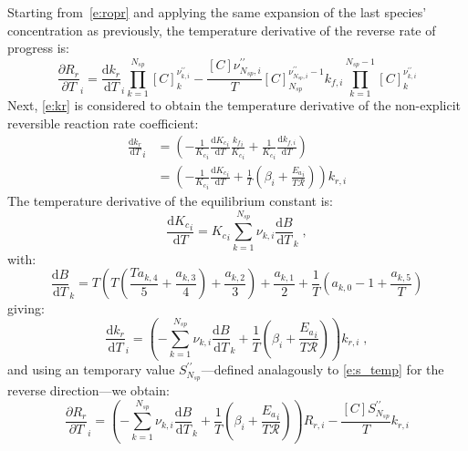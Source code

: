 \documentclass[12pt]{article}
\newcommand{\ns}{N_{sp}}
\newcommand{\Ru}{\mathcal{R}}
\begin{document}
Starting from~\cref{e:ropr} and applying the same expansion of the last species' concentration as previously, the temperature derivative of the reverse rate of progress is:
\begin{equation}
 \label{e:droprdt_1}
 \frac{\partial {R_r} }{\partial T }_{i} = \frac{\text{d} {k_r} }{\text{d} T }_{i} \prod_{k=1}^{\ns} [C]_{k}^{\nu^{\prime\prime}_{k,i}} - \frac{[C] \nu^{\prime\prime}_{\ns,i}}{T} [C]_{\ns}^{\nu^{\prime\prime}_{\ns,i} - 1} {k_{f, i}} \prod_{k=1}^{\ns  - 1} [C]_{k}^{\nu^{\prime\prime}_{k,i}}
\end{equation}
Next, \cref{e:kr} is considered to obtain the temperature derivative of the non-explicit reversible reaction rate coefficient:
\begin{align}
 \frac{\text{d} {k_r} }{\text{d} T }_{i} &= \left(- \frac{1}{{K_c}_{i}} \frac{\text{d} {K_c}_{i} }{\text{d} T } \frac{{k_f}_i}{{K_c}_i} + \frac{1}{{K_c}_{i}}\frac{\text{d} {k_{f, i}} }{\text{d} T } \right) \nonumber \\
				         &= \left(- \frac{1}{{K_c}_{i}} \frac{\text{d} {K_c}_{i} }{\text{d} T } + \frac{1}{T} \left(\beta_{i} + \frac{{E_{a}}_{i}}{T \Ru}\right)\right) {k_{r, i}}
\end{align}
The temperature derivative of the equilibrium constant is:
\begin{equation}
 \frac{\text{d} {K_c}_{i} }{\text{d} T } = {K_c}_{i} \sum_{k=1}^{\ns} \nu_{k,i} \frac{\text{d} B }{\text{d} T }_{k} \;,
\end{equation}
with:
\begin{equation}
 \frac{\text{d} B }{\text{d} T }_{k} = T \left(T \left(\frac{T a_{k,4}}{5} + \frac{a_{k,3}}{4}\right) + \frac{a_{k,2}}{3}\right) + \frac{a_{k,1}}{2} + \frac{1}{T} \left(a_{k,0} - 1 + \frac{a_{k,5}}{T}\right)
\end{equation}
giving:
\begin{equation}
\label{e:dkr_dt}
\frac{\text{d} {k_r} }{\text{d} T }_{i} = \left(- \sum_{k=1}^{\ns} \nu_{k,i} \frac{\text{d} B }{\text{d} T }_{k} + \frac{1}{T} \left(\beta_{i} + \frac{{E_{a}}_{i}}{T \Ru}\right)\right) {k_{r, i}} \;,
\end{equation}
and using an temporary value $S^{\prime\prime}_{\ns}$---defined analagously to \cref{e:s_temp} for the reverse direction---we obtain:
\begin{equation}
\label{e:dropr_dt}
\frac{\partial {R_r} }{\partial T }_{i} = \left(- \sum_{k=1}^{\ns} \nu_{k,i} \frac{\text{d} B }{\text{d} T }_{k} + \frac{1}{T} \left(\beta_{i} + \frac{{E_{a}}_{i}}{T \Ru}\right)\right) {R_{r, i}} - \frac{[C] S^{\prime\prime}_{\ns}}{T} {k_{r, i}}
\end{equation}
\end{document}
